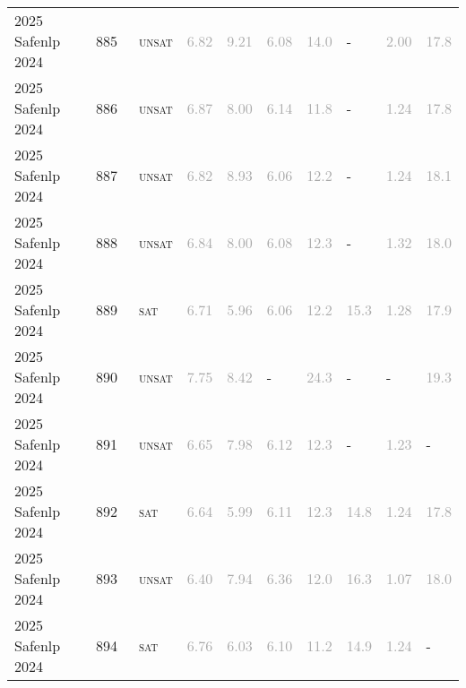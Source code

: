 \begin{center}
{\begin{longtable}{@{}llllllllll@{}}
2025 Safenlp 2024 & 885 & ~\textsc{unsat} & \textcolor{darkgray}{6.82} & \textcolor{darkgray}{9.21} & \textcolor{darkgray}{6.08} & \textcolor{darkgray}{14.0} & - & \textcolor{darkgray}{2.00} & \textcolor{darkgray}{17.8} \\
2025 Safenlp 2024 & 886 & ~\textsc{unsat} & \textcolor{darkgray}{6.87} & \textcolor{darkgray}{8.00} & \textcolor{darkgray}{6.14} & \textcolor{darkgray}{11.8} & - & \textcolor{darkgray}{1.24} & \textcolor{darkgray}{17.8} \\
2025 Safenlp 2024 & 887 & ~\textsc{unsat} & \textcolor{darkgray}{6.82} & \textcolor{darkgray}{8.93} & \textcolor{darkgray}{6.06} & \textcolor{darkgray}{12.2} & - & \textcolor{darkgray}{1.24} & \textcolor{darkgray}{18.1} \\
2025 Safenlp 2024 & 888 & ~\textsc{unsat} & \textcolor{darkgray}{6.84} & \textcolor{darkgray}{8.00} & \textcolor{darkgray}{6.08} & \textcolor{darkgray}{12.3} & - & \textcolor{darkgray}{1.32} & \textcolor{darkgray}{18.0} \\
2025 Safenlp 2024 & 889 & ~\textsc{sat} & \textcolor{darkgray}{6.71} & \textcolor{darkgray}{5.96} & \textcolor{darkgray}{6.06} & \textcolor{darkgray}{12.2} & \textcolor{darkgray}{15.3} & \textcolor{darkgray}{1.28} & \textcolor{darkgray}{17.9} \\
2025 Safenlp 2024 & 890 & ~\textsc{unsat} & \textcolor{darkgray}{7.75} & \textcolor{darkgray}{8.42} & - & \textcolor{darkgray}{24.3} & - & - & \textcolor{darkgray}{19.3} \\
2025 Safenlp 2024 & 891 & ~\textsc{unsat} & \textcolor{darkgray}{6.65} & \textcolor{darkgray}{7.98} & \textcolor{darkgray}{6.12} & \textcolor{darkgray}{12.3} & - & \textcolor{darkgray}{1.23} & - \\
2025 Safenlp 2024 & 892 & ~\textsc{sat} & \textcolor{darkgray}{6.64} & \textcolor{darkgray}{5.99} & \textcolor{darkgray}{6.11} & \textcolor{darkgray}{12.3} & \textcolor{darkgray}{14.8} & \textcolor{darkgray}{1.24} & \textcolor{darkgray}{17.8} \\
2025 Safenlp 2024 & 893 & ~\textsc{unsat} & \textcolor{darkgray}{6.40} & \textcolor{darkgray}{7.94} & \textcolor{darkgray}{6.36} & \textcolor{darkgray}{12.0} & \textcolor{darkgray}{16.3} & \textcolor{darkgray}{1.07} & \textcolor{darkgray}{18.0} \\
2025 Safenlp 2024 & 894 & ~\textsc{sat} & \textcolor{darkgray}{6.76} & \textcolor{darkgray}{6.03} & \textcolor{darkgray}{6.10} & \textcolor{darkgray}{11.2} & \textcolor{darkgray}{14.9} & \textcolor{darkgray}{1.24} & - \\

\end{longtable}}
\end{center}

